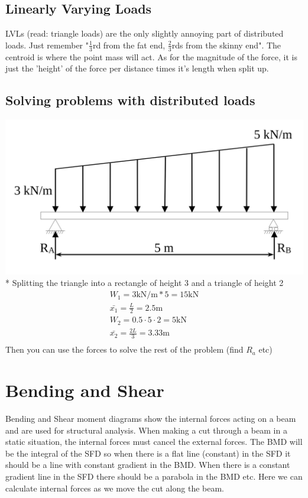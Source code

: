 \documentclass[a4paper, 12pt]{article}
\begin{document}
\subsection{Linearly Varying Loads}
LVLs (read: triangle loads) are the only slightly annoying part of distributed loads. Just remember "$\frac{1}{3}$rd from 
the fat end, $\frac{2}{3}$rds from the skinny end". The centroid is where the point mass will act. As for the magnitude 
of the force, it is just the 'height' of the force per distance times it's length when split up.

\subsection{Solving problems with distributed loads}
\includegraphics[scale=0.2]{lvl} \\*
Splitting the triangle into a rectangle of height 3 and a triangle of height 2 
\begin{align*}
    W_1 = 3 \text{kN/m} * 5 = 15\text{kN} \\
    \bar{x_1} = \frac{L}{2} = 2.5\text{m} \\
    W_2 = 0.5 \cdot 5 \cdot 2 = 5\text{kN} \\
    \bar{x_2} = \frac{2L}{3} = 3.33\text{m} \\
\end{align*}
Then you can use the forces to solve the rest of the problem (find $R_a$ etc)

\section{Bending and Shear}
Bending and Shear moment diagrams show the internal forces acting on a beam and are used
for structural analysis. When making a cut through a beam in a static situation, the 
internal forces must cancel the external forces. The BMD will be the integral of the SFD so
when there is a flat line (constant) in the SFD it should be a line with constant gradient in
the BMD. When there is a constant gradient line in the SFD there should be a parabola in the BMD etc.
Here we can calculate internal forces as we move the cut along the beam.
\end{document}
